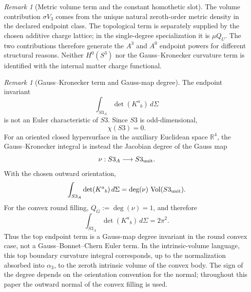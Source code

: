 \documentclass[11pt,a4paper]{article}
\def\Sthree{S3}%
\def\dd{d}%
\def\QU{Q_U}%
\def\QG{Q_G}%
\numberwithin{equation}{section}
\theoremstyle{definition}
\theoremstyle{plain}
\theoremstyle{remark}
\newtheorem{remark}[criterion]{Remark}
\newcommand{\Sthree}{S^3}
\newcommand{\vol}{\operatorname{Vol}}
\newcommand{\dd}{\mathrm{d}}
\newcommand{\QG}{Q_{\rm G}}
\newcommand{\QU}{Q_U}
\begin{document}
\begin{remark}[Metric volume term and the constant homothetic slot]
The volume contribution \(\sigma V_3\) comes from the unique natural zeroth-order metric density in the declared endpoint class. The topological term is separately supplied by the chosen additive charge lattice; in the single-degree specialization it is \(\mu\QU\). The two contributions therefore generate the \(A^3\) and \(A^0\) endpoint powers for different structural reasons. Neither \(H^0(S^3)\) nor the Gauss--Kronecker curvature term is identified with the internal matter charge functional.
\end{remark}

\begin{remark}[Gauss--Kronecker term and Gauss-map degree]
The endpoint invariant
\begin{equation}
\int_{\Sthree_A}\det(K^a{}_b)\,\dd\Sigma
\end{equation}
is not an Euler characteristic of \(\Sthree\). Since \(\Sthree\) is odd-dimensional,
\begin{equation}
\chi(\Sthree)=0.
\end{equation}
For an oriented closed hypersurface in the auxiliary Euclidean space \(\mathbb{R}^4\), the Gauss--Kronecker integral is instead the Jacobian degree of the Gauss map
\begin{equation}
\nu:\Sthree_A\longrightarrow \Sthree_{\rm unit}.
\end{equation}
With the chosen outward orientation,
\begin{equation}
\int_{\Sthree_A}\det(K^a{}_b)\,\dd\Sigma
=\deg(\nu)\,\vol(\Sthree_{\rm unit}).
\end{equation}
For the convex round filling, \(\QG:=\deg(\nu)=1\), and therefore
\begin{equation}
\int_{\Sthree_A}\det(K^a{}_b)\,\dd\Sigma=2\pi^2.
\end{equation}
Thus the top endpoint term is a Gauss-map degree invariant in the round convex case, not a Gauss--Bonnet--Chern Euler term. In the intrinsic-volume language, this top boundary curvature integral corresponds, up to the normalization absorbed into \(\alpha_3\), to the zeroth intrinsic volume of the convex body. The sign of the degree depends on the orientation convention for the normal; throughout this paper the outward normal of the convex filling is used.
\end{remark}
\end{document}
